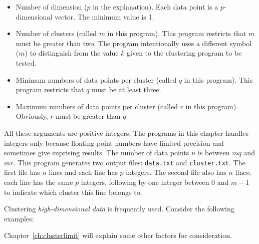 \begin{itemize}
\item Number of dimension ($p$ in the explanation).  Each data point
  is a $p$-dimensional vector. The minimum value is 1.

\item Number of clusters (called $m$ in this program).  This program
  restricts that $m$ must be greater than two.  The program
  intentionally uses a different symbol ($m$) to distinguish from the
  value $k$ given to the clustering program to be tested.

\item Minimum numbers of data points per cluster (called $q$ in this
  program).  This program restricts that $q$ must be at least three.

\item Maximum numbers of data points per cluster (called $r$ in this
  program). Obviously, $r$ must be greater than $q$.

\end{itemize}  

All these arguments are positive integers.  The programs in this
chapter handles integers only because floating-point numbers have
limited precision and sometimes give suprising results.  The number of
data points $n$ is between $m q$ and $m r$.
  This program
generates two output files: {\tt data.txt} and {\tt cluster.txt}.  The
first file has $n$ lines and each line has $p$ integers.  The second
file also has $n$ lines; each line has the same $p$ integers,
following by one integer between $0$ and $m - 1$ to indicate which
cluster this line belongs to.

\resetlinenumber[1]
\linenumbers
\begin{tt}
  
\end{tt}
\nolinenumbers

\resetlinenumber[1]
\linenumbers
\begin{tt}
  
\end{tt}
\nolinenumbers

Clustering {\it high-dimensional data} is frequently used. Consider
the following examples:



Chapter~\ref{ch:clusterlimit}
will explain some other factors for consideration.
